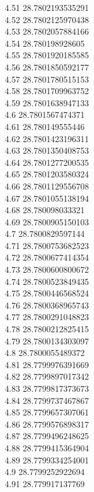 {4.51	28.7802193535291\\
4.52	28.7802125970438\\
4.53	28.7802057884166\\
4.54	28.780198928605\\
4.55	28.7801920185585\\
4.56	28.7801850592177\\
4.57	28.7801780515153\\
4.58	28.7801709963752\\
4.59	28.7801638947133\\
4.6	28.7801567474371\\
4.61	28.780149555446\\
4.62	28.7801423196311\\
4.63	28.7801350408753\\
4.64	28.7801277200535\\
4.65	28.7801203580324\\
4.66	28.7801129556708\\
4.67	28.7801055138194\\
4.68	28.780098033321\\
4.69	28.7800905150103\\
4.7	28.7800829597144\\
4.71	28.7800753682523\\
4.72	28.7800677414354\\
4.73	28.7800600800672\\
4.74	28.7800523849435\\
4.75	28.7800446568524\\
4.76	28.7800368965743\\
4.77	28.7800291048823\\
4.78	28.7800212825415\\
4.79	28.7800134303097\\
4.8	28.7800055489372\\
4.81	28.7799976391669\\
4.82	28.7799897017342\\
4.83	28.7799817373673\\
4.84	28.7799737467867\\
4.85	28.7799657307061\\
4.86	28.7799576898317\\
4.87	28.7799496248625\\
4.88	28.7799415364904\\
4.89	28.7799334254001\\
4.9	28.7799252922694\\
4.91	28.779917137769\\
}
